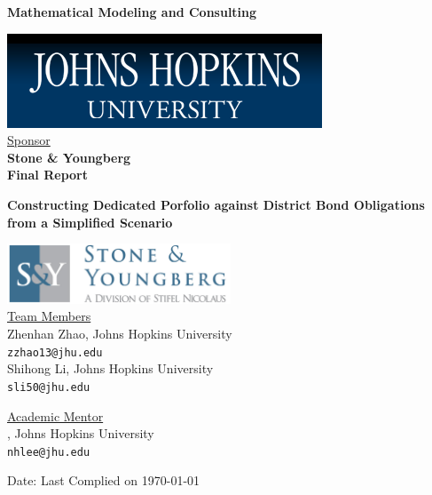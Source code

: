 \documentclass[oneside,12pt]{report}
\begin{document}
\def\thefootnote{\fnsymbol{footnote}}

\thispagestyle{empty}

\def\shiftdowna{0.32in}  %
\def\shiftdownb{0.22in}  %


\begin{center}
\textbf{{\large Mathematical Modeling and Consulting }}\\

\vspace \shiftdowna

 \includegraphics{jhu.png}\\


\vspace \shiftdowna
\underline {Sponsor}\\ 
\vspace{5pt}
\textbf{\large Stone \& Youngberg} \\
\vspace\shiftdowna
\textbf{{Final Report}}

\vspace \shiftdowna
\textbf{{\Large Constructing Dedicated Porfolio against District Bond Obligations from a Simplified Scenario}}

\vspace \shiftdowna
\includegraphics[width=0.5\textwidth]{stone.jpeg}\\
\vspace{0.35in}
\underline {Team Members}\\
\vspace{5pt}
Zhenhan Zhao, Johns Hopkins University\\
\texttt{zzhao13@jhu.edu} \\
\vspace{10pt}
Shihong Li, Johns Hopkins University\\
\texttt{sli50@jhu.edu}

\vspace \shiftdownb
\underline {Academic Mentor} \\
\vspace{5pt}
, Johns Hopkins University\\
\texttt{nhlee@jhu.edu}


\vspace \shiftdowna
Date: Last Complied on \today

\end{center}
\end{document}
